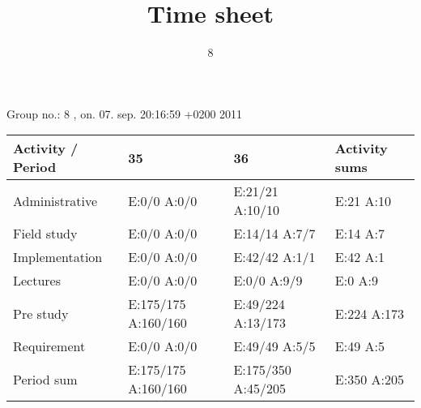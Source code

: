 \documentclass[a4paper]{article}
\title{Time sheet}
\author{8}
\begin{document}
\begin{landscape}
\begin{center}
	Group no.: 8
	, on. 07. sep. 20:16:59 +0200 2011

	\begin{tabular}{| l | l | l | l |}
		\hline
		Activity / Period & 35 & 36 & Activity sums \\
		\hline \hline
		
Administrative & E:0/0 A:0/0 & E:21/21 A:10/10 & E:21 A:10 \\
Field study & E:0/0 A:0/0 & E:14/14 A:7/7 & E:14 A:7 \\
Implementation & E:0/0 A:0/0 & E:42/42 A:1/1 & E:42 A:1 \\
Lectures & E:0/0 A:0/0 & E:0/0 A:9/9 & E:0 A:9 \\
Pre study & E:175/175 A:160/160 & E:49/224 A:13/173 & E:224 A:173 \\
Requirement & E:0/0 A:0/0 & E:49/49 A:5/5 & E:49 A:5 \\
Period sum & E:175/175 A:160/160 & E:175/350 A:45/205 & E:350 A:205 \\
		\hline
	\end{tabular}
\end{center}
\end{landscape}
\end{document}
